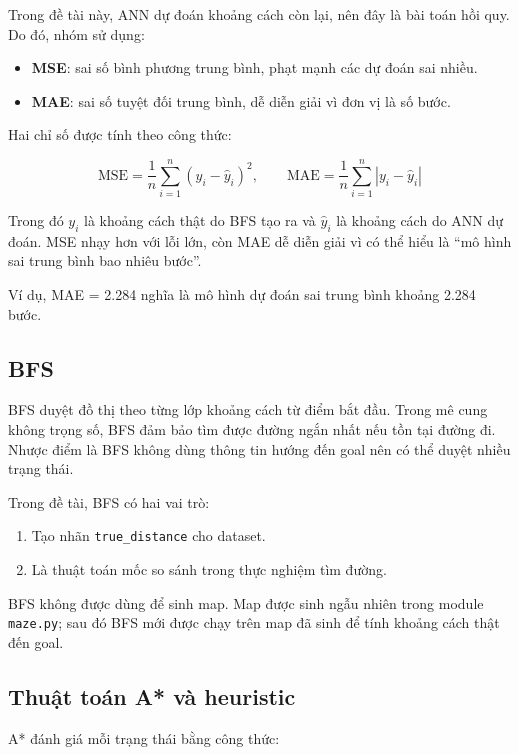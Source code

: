 \documentclass[12pt,a4paper]{article}
\begin{document}
Trong đề tài này, ANN dự đoán khoảng cách còn lại, nên đây là bài toán hồi quy. Do đó, nhóm sử dụng:

\begin{itemize}
    \item \textbf{MSE}: sai số bình phương trung bình, phạt mạnh các dự đoán sai nhiều.
    \item \textbf{MAE}: sai số tuyệt đối trung bình, dễ diễn giải vì đơn vị là số bước.
\end{itemize}

Hai chỉ số được tính theo công thức:

\[
    \text{MSE} = \frac{1}{n}\sum_{i=1}^{n}(y_i - \hat{y}_i)^2,
    \qquad
    \text{MAE} = \frac{1}{n}\sum_{i=1}^{n}|y_i - \hat{y}_i|
\]

Trong đó \(y_i\) là khoảng cách thật do BFS tạo ra và \(\hat{y}_i\) là khoảng cách do ANN dự đoán. MSE nhạy hơn với lỗi lớn, còn MAE dễ diễn giải vì có thể hiểu là ``mô hình sai trung bình bao nhiêu bước''.

Ví dụ, MAE = 2.284 nghĩa là mô hình dự đoán sai trung bình khoảng 2.284 bước.

\subsection{BFS}

BFS duyệt đồ thị theo từng lớp khoảng cách từ điểm bắt đầu. Trong mê cung không trọng số, BFS đảm bảo tìm được đường ngắn nhất nếu tồn tại đường đi. Nhược điểm là BFS không dùng thông tin hướng đến goal nên có thể duyệt nhiều trạng thái.

Trong đề tài, BFS có hai vai trò:

\begin{enumerate}
    \item Tạo nhãn \texttt{true\_distance} cho dataset.
    \item Là thuật toán mốc so sánh trong thực nghiệm tìm đường.
\end{enumerate}

BFS không được dùng để sinh map. Map được sinh ngẫu nhiên trong module \texttt{maze.py}; sau đó BFS mới được chạy trên map đã sinh để tính khoảng cách thật đến goal.

\subsection{Thuật toán A* và heuristic}

A* đánh giá mỗi trạng thái bằng công thức:
\end{document}
